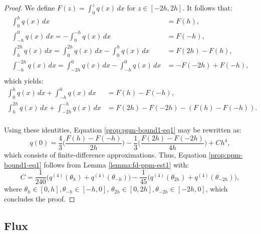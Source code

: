 \begin{proof}
	We define $F(z) = \int_{0}^{z} q(x) \,dx $ for $z \in [-2h, 2h]$. 
	It follows that:
	\begin{align*}
		\int_{ 0}^{h}   q(x) \,dx &= F(h),\\
		\int_{-h}^{0}   q(x) \,dx = -\int_{ 0}^{-h} q(x)  \,dx  &= F(-h),\\ 
		\int_{ h}^{2h}  q(x) \,dx =  \int_{ 0}^{2h} q(x)  \,dx - \int_{ 0}^{h} q(x) \,dx  &= F(2h) - F(h),\\ 
		\int_{-h}^{-2h} q(x) \,dx =  \int_{-2h }^{0} q(x) \,dx - \int_{-h}^{0} q(x) \,d x&= -F(-2h) + F(-h),\\ 
	\end{align*}
	which yields:
	\begin{align*}
		\int_{0}^{h} q(x) \,dx + \int_{-h}^{0} q(x) \,dx &=
		F(h) - F(-h), \\
		\int_{h}^{2h} q(x) \,dx + \int_{-2h}^{-h} q(x) \,dx &=
		F(2h) - F(-2h) - (F(h) - F(-h)). \\
	\end{align*}
	
	Using these identities, Equation \eqref{prop:ppm-bound1-eq1} may be rewritten as:
	\begin{equation}
		\label{prop:ppm-bound1-eq2}
		q(0) = \frac{4}{3} \bigg(\frac{F(h) - F(-h)}{2h}\bigg)
		       - \frac{1}{3} \bigg(\frac{F(2h) - F(-2h)}{4h}\bigg)
+ Ch^4,
	\end{equation}
	which consists of finite-difference approximations. 
	Thus, Equation \eqref{prop:ppm-bound1-eq1} follows from Lemma \ref{lemma:fd-ppm-est1}
	with:
	\begin{equation}
		\label{prop:ppm-bound1-eq3}
		C = \frac{1}{240}\bigg( q^{(4)}(\theta_{h}) + q^{(4)}(\theta_{-h})\bigg)
		- \frac{1}{45}\bigg( q^{(4)}(\theta_{2h}) + q^{(4)}(\theta_{-2h})\bigg), 
	\end{equation}
	where $\theta_{h} \in [0,h], \theta_{-h}\in [-h,0]$, 
	$\theta_{2h} \in [0,2h], \theta_{-2h}\in [-2h,0]$,
	which concludes the proof.

  \renewcommand\qedsymbol{} %
\end{proof}

\subsection{Flux}
\label{chp1-sec-flux}


